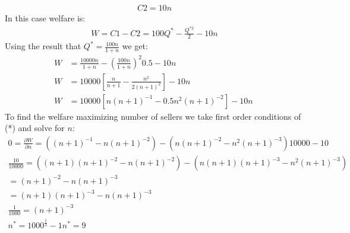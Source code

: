 \documentclass{article}
\begin{document}
\begin{itemize}
\begin{itemize}
      \begin{gather*}
        C2 = 10n
      \end{gather*}
      In this case welfare is:
      \begin{gather*}
        W = C1 - C2 = 100Q^{*} - \frac{Q^{*2}}{2} - 10n
      \end{gather*}
      Using the result that $Q^{*} = \tfrac{100n}{1+n}$ we get:
      \begin{align*}
        W &= \frac{10000n}{1+n} - (\frac{100n}{1+n})^{2}0.5 - 10n \\
        W &= 10000 [\frac{n}{n+1} - \frac{n^{2}}{2(n+1)^{2}}] - 10n \\
        W &= 10000 [n(n+1)^{-1} - 0.5n^{2}(n+1)^{-2}] - 10n \ \tag{*}
      \end{align*}
      To find the welfare maximizing number of sellers we take first order conditions of (*) and solve for $n$:
      \begin{gather*}
        0 = \frac{\partial W}{\partial n} = ((n+1)^{-1}- n(n+1)^{-2}) - (n(n+1)^{-2} - n^{2}(n+1)^{-3})10000 - 10 \\
        \frac{10}{10000} = ((n+1)(n+1)^{-2} - n(n+1)^{-2}) - (n(n+1)(n+1)^{-3} - n^{2}(n+1)^{-3}) \\
        = (n+1)^{-2} - n(n+1)^{-3} \\
        = (n+1)(n+1)^{-3} - n(n+1)^{-3} \\
        \frac{1}{1000} = (n+1)^{-3} \\
        n^{*} = 1000^{\tfrac{1}{3}} - 1
        n^{*} = 9
      \end{gather*}
    \end{itemize}
  \end{itemize}
\par
\end{document}
